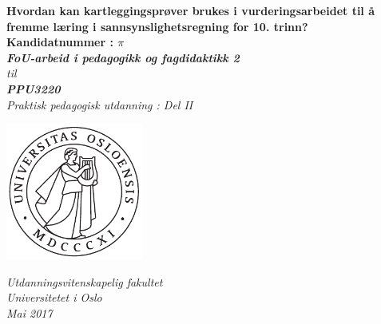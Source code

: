 \documentclass[main.tex]{subfiles}
\begin{document}
\thispagestyle{empty}
\begin{center}        %
  \vspace{5mm}        %
  \LARGE
  \textbf{Hvordan kan kartleggingsprøver brukes i vurderingsarbeidet til å fremme læring i 
          sannsynslighetsregning for 10. trinn?} \\
  \Large
  \vspace{10mm}
  \large
  \textbf{Kandidatnummer : $\pi$} \\
  \vspace{20mm}
  \Large
  {\bf{\textsl{FoU-arbeid i pedagogikk og fagdidaktikk 2}}} \\
  \textsl{til} \\
  \vspace{2mm}
  {\bf{\textsl{PPU3220}}} \\
  \vspace{5mm}
  {\large \textsl {Praktisk pedagogisk utdanning : Del II}}\\
  \vspace{10mm}
  \centerline{\includegraphics[width=45mm,height=45mm]{../figures/uiosegl.pdf}} 
  \vspace{8mm}
  \textsl{Utdanningsvitenskapelig fakultet} \\
  \textsl{Universitetet i Oslo} \\
  \vspace{5mm}
  \large
  \textsl{Mai 2017} \\
  \vspace{2cm}


\end{center}
\end{document}
